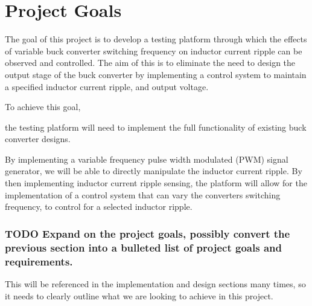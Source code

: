 \section{Project Goals}\label{S:goals}

The goal of this project is to develop a testing platform through which the effects of variable buck converter switching frequency on inductor current ripple can be observed and controlled. The aim of this is to eliminate the need to design the output stage of the buck converter by implementing a control system to maintain a specified inductor current ripple, and output voltage.

To achieve this goal, 

the testing platform will need to implement the full functionality of existing buck converter designs.

By implementing a variable frequency pulse width modulated (PWM) signal generator, we will be able to directly manipulate the inductor current ripple. By then implementing inductor current ripple sensing, the platform will allow for the implementation of a control system that can vary the converters switching frequency, to control for a selected inductor ripple.





\subsubsection{TODO Expand on the project goals, possibly convert the previous section into a bulleted list of project goals and requirements.}

This will be referenced in the implementation and design sections many times, so it needs to clearly outline what we are looking to achieve in this project. 